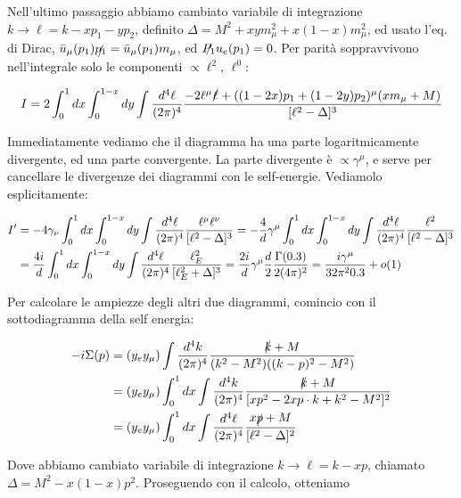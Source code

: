 \documentclass[11pt]{report}
\begin{document}
Nell'ultimo passaggio abbiamo cambiato variabile di integrazione \(k \to \ell = k - xp_1 - yp_2\), definito \(\Delta = M^2 + xym_\mu^2 + x(1-x)m_\mu^2\), ed usato l'eq. di Dirac, \(\bar{u}_\mu(p_1)\slashed{p_1} = \bar{u}_\mu (p_1)m_\mu\), ed \(\slashed{P_1}u_e(p_1) = 0\). Per parità soppravvivono nell'integrale solo le componenti \(\propto \ell^2, \, \ell^0\): 

\begin{align}
    I = 2\int_0^1 dx \int_0^{1-x}dy \int \frac{d^4\ell}{(2\pi)^4}\frac{-2\ell^\mu \slashed{\ell} + ((1-2x)p_1 + (1-2y)p_2)^\mu(xm_\mu +M)}{[\ell^2 - \Delta]^3}
\end{align}

Immediatamente vediamo che il diagramma ha una parte logaritmicamente divergente, ed una parte convergente. La parte divergente è \(\propto \gamma^\mu\), e serve per cancellare le divergenze dei diagrammi con le self-energie. Vediamolo esplicitamente: 

\begin{align}
    \label{eq:infinitetriangle}
    I' &= -4 \gamma_\nu \int_0^1 dx \int_0^{1-x}dy \int \frac{d^4\ell}{(2\pi)^4}\frac{\ell^\mu \ell^\nu}{[\ell^2 -\Delta]^3} = -\frac{4}{d} \gamma^\mu \int_0^1 dx \int_0^{1-x}dy \int \frac{d^4\ell}{(2\pi)^4}\frac{\ell^2}{[\ell^2 -\Delta]^3} \notag \\ 
    &= \frac{4i}{d}\int_0^1 dx \int_0^{1-x}dy \int \frac{d^4\ell}{(2\pi)^4}\frac{\ell_E^2}{[\ell_E^2 + \Delta]^3} = \frac{2i}{d}\gamma^\mu \frac{d}{2}\frac{\Gamma(0.3)}{2(4\pi)^2} = \frac{i\gamma^\mu}{32\pi^20.3} + o(1)
\end{align}

Per calcolare le ampiezze degli altri due diagrammi, comincio con il sottodiagramma della self energia: 

\begin{align}
    -i\Sigma(p) &= (y_e y_\mu) \int \frac{d^4k}{(2\pi)^4}\frac{\slashed{k}+M}{(k^2 -M^2)((k-p)^2 - M^2)} \notag \\ 
    &= (y_e y_\mu) \int_0^1 dx \int \frac{d^4k}{(2\pi)^4}\frac{\slashed{k}+M}{[xp^2 -2xp\cdot k + k^2 - M^2]^2} \notag \\ 
    &= (y_e y_\mu) \int_0^1 dx \int \frac{d^4\ell}{(2\pi)^4}\frac{x\slashed{p} + M}{[\ell^2 - \Delta]^2}
\end{align}

Dove abbiamo cambiato variabile di integrazione \(k \to \ell = k-xp\), chiamato \(\Delta = M^2 -x(1-x)p^2\). Proseguendo con il calcolo, otteniamo 
\end{document}
